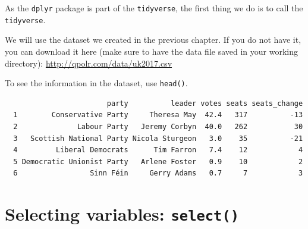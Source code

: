 \documentclass[12pt,oneside]{reedthesis}
\theoremstyle{definition}
\theoremstyle{definition}
\theoremstyle{definition}
\theoremstyle{remark}
\begin{document}
  As the \texttt{dplyr} package is part of the \texttt{tidyverse}, the
  first thing we do is to call the \texttt{tidyverse}.
  \begin{Shaded}
  \begin{Highlighting}[]
  \NormalTok{(}\NormalTok{)}
  \end{Highlighting}
  \end{Shaded}
  We will use the dataset we created in the previous chapter. If you do
  not have it, you can download it here (make sure to have the data file
  saved in your working directory): \url{http://qpolr.com/data/uk2017.csv}
  \begin{Shaded}
  \begin{Highlighting}[]
  \StringTok{ }\NormalTok{(}\NormalTok{)}
  \end{Highlighting}
  \end{Shaded}
  To see the information in the dataset, use \texttt{head()}.
  \begin{Shaded}
  \begin{Highlighting}[]
  \end{Highlighting}
  \end{Shaded}
  \begin{verbatim}
                        party          leader votes seats seats_change
  1        Conservative Party     Theresa May  42.4   317          -13
  2              Labour Party   Jeremy Corbyn  40.0   262           30
  3   Scottish National Party Nicola Sturgeon   3.0    35          -21
  4         Liberal Democrats      Tim Farron   7.4    12            4
  5 Democratic Unionist Party   Arlene Foster   0.9    10            2
  6                 Sinn Féin     Gerry Adams   0.7     7            3
  \end{verbatim}
  \section{\texorpdfstring{Selecting variables:
  \texttt{select()}}{Selecting variables: select()}}\label{selecting-variables-select}
  
\end{document}
